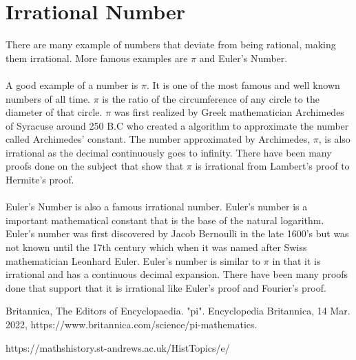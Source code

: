\documentclass{article}
\begin{document}
\section{Irrational Number}
There are many example of numbers that deviate from being rational, making them irrational.
More famous examples are $\pi$ and Euler's Number. 
\\\\ A good example of a number is $\pi$. It is one of the most famous and well known numbers of all time. $\pi$ is the ratio of 
the circumference of any circle to the diameter of that circle. $\pi$ was first realized by
Greek mathematician Archimedes of Syracuse around 250 B.C who created a algorithm to approximate
the number called Archimedes' constant. The number approximated by Archimedes, $\pi$, is also 
irrational as the decimal continuously goes to infinity. There have been many proofs done on the subject
that show that $\pi$ is irrational from Lambert's proof to Hermite's proof.
\\\\Euler's Number is also a famous irrational number. Euler's number is a important mathematical constant
that is the base of the natural logarithm. Euler's number was first discovered by Jacob Bernoulli in the late 1600's
but was not known until the 17th century which when it was named after Swiss mathematician Leonhard Euler.
Euler's number is similar to $\pi$ in that it is irrational and has a continuous decimal expansion. There have been many proofs
done that support that it is irrational like Euler's proof and Fourier's proof.

\begin{thebibliography}{9}
    Britannica, The Editors of Encyclopaedia. "pi". Encyclopedia Britannica, 14 Mar. 2022, https://www.britannica.com/science/pi-mathematics. 
    
    https://mathshistory.st-andrews.ac.uk/HistTopics/e/
\end{thebibliography}
\end{document}
